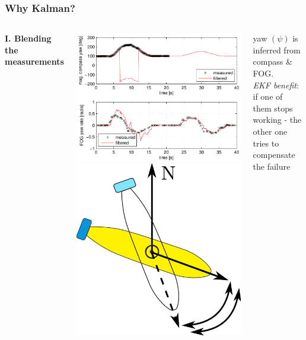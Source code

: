 \begin{frame}\frametitle{Why Kalman?}
\begin{columns}[t]
\textbf{I. Blending the measurements}\\ %
\vspace{-1em}
\begin{center}
\includegraphics[width=0.8\linewidth]{fig/lostCompass.pdf}
\includegraphics[width=0.19\linewidth]{fig/rotate.pdf} \\
\end{center}
\vspace{-1em}
yaw $(\psi)$ is inferred from compass \& FOG.\\
\textit{EKF benefit}: \pro if one of them stops working - the other one tries to compensate the failure


\end{columns}
\end{frame}
